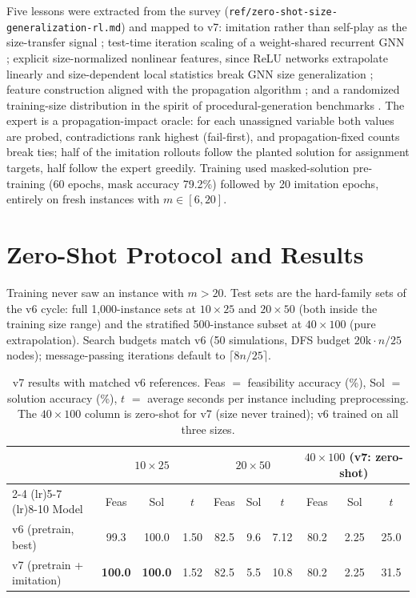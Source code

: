 \documentclass[12pt]{article}
\begin{document}
Five lessons were extracted from the survey (\texttt{ref/zero-shot-size-generalization-rl.md}) and mapped to v7: imitation rather than self-play as the size-transfer signal \citep{gasse2019exact}; test-time iteration scaling of a weight-shared recurrent GNN \citep{selsam2019learning}; explicit size-normalized nonlinear features, since ReLU networks extrapolate linearly \citep{xu2021extrapolate} and size-dependent local statistics break GNN size generalization \citep{yehudai2021local}; feature construction aligned with the propagation algorithm \citep{xu2020reason}; and a randomized training-size distribution in the spirit of procedural-generation benchmarks \citep{cobbe2020procgen}. The expert is a propagation-impact oracle: for each unassigned variable both values are probed, contradictions rank highest (fail-first), and propagation-fixed counts break ties; half of the imitation rollouts follow the planted solution for assignment targets, half follow the expert greedily. Training used masked-solution pre-training (60 epochs, mask accuracy 79.2\%) followed by 20 imitation epochs, entirely on fresh instances with $m \in [6, 20]$.

\section{Zero-Shot Protocol and Results}

Training never saw an instance with $m > 20$. Test sets are the hard-family sets of the v6 cycle: full 1{,}000-instance sets at $10 \times 25$ and $20 \times 50$ (both inside the training size range) and the stratified 500-instance subset at $40 \times 100$ (pure extrapolation). Search budgets match v6 (50 simulations, DFS budget $20\mathrm{k} \cdot n/25$ nodes); message-passing iterations default to $\lceil 8n/25 \rceil$.

\begin{table}[t]
\centering
\caption{v7 results with matched v6 references. Feas $=$ feasibility accuracy (\%), Sol $=$ solution accuracy (\%), $t$ $=$ average seconds per instance including preprocessing. The $40 \times 100$ column is zero-shot for v7 (size never trained); v6 trained on all three sizes.}
\label{tab:v7}
\begin{tabular}{l ccc ccc ccc}
\toprule
& \multicolumn{3}{c}{$10 \times 25$} & \multicolumn{3}{c}{$20 \times 50$} & \multicolumn{3}{c}{$40 \times 100$ (v7: zero-shot)} \\
\cmidrule(lr){2-4} \cmidrule(lr){5-7} \cmidrule(lr){8-10}
Model & Feas & Sol & $t$ & Feas & Sol & $t$ & Feas & Sol & $t$ \\
\midrule
v6 (pretrain, best) & 99.3 & 100.0 & 1.50 & 82.5 & 9.6 & 7.12 & 80.2 & 2.25 & 25.0 \\
v7 (pretrain + imitation) & \textbf{100.0} & \textbf{100.0} & 1.52 & 82.5 & 5.5 & 10.8 & 80.2 & 2.25 & 31.5 \\
\bottomrule
\end{tabular}
\end{table}
\end{document}
